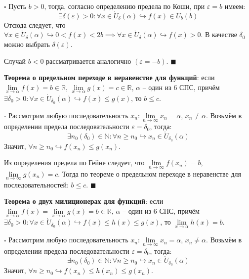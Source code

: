 \documentclass[12pt, a4paper, reqno]{article}
\begin{document}
    $\square$ Пусть $b > 0$, тогда, согласно определению предела по Коши, при $\varepsilon = b$
    имеем:
    \begin{equation*}
        \exists\delta(\varepsilon) > 0: \forall x\in \mathring U_{\delta}(\alpha) \hookrightarrow
        f(x)\in U_{b}(b)
    \end{equation*}
    Отсюда следует, что $\forall x\in \mathring U_{\delta}(\alpha) \hookrightarrow 0 < f(x) < 2b
    \implies \forall x\in \mathring U_{\delta}(\alpha) \hookrightarrow f(x) > 0$. В качестве
    $\delta_0$ можно выбрать $\delta(\varepsilon)$.

    Случай $b < 0$ рассматривается аналогично $(\varepsilon = -b)$. $\blacksquare$

    \textbf{Теорема о предельном переходе в неравенстве для функций}: если $\lim\limits_{x\to\alpha}
    f(x) = b\in\mathbb{R}$, $\lim\limits_{x\to\alpha} g(x) = c\in\mathbb{R}$, $\alpha$ -- один из 6
    СПС, причём $\exists\delta_0 > 0: \forall x\in \mathring U_{\delta_0}(\alpha) \hookrightarrow
    f(x)\leq g(x)$, то $b \leq c$.

    $\square$ Рассмотрим любую последовательность $x_n: \lim\limits_{n\to\infty} x_n = \alpha$, $x_n
    \neq \alpha$. Возьмём в определении предела последовательности $\varepsilon = \delta_0$, тогда:
    \begin{equation*}
        \exists n_0(\delta_0)\in\mathbb{N}: \forall n\geq n_0\hookrightarrow x_n\in \mathring
        U_{\delta_0}(\alpha)
    \end{equation*}
    Значит, $\forall n\geq n_0\hookrightarrow f(x_n) \leq g(x_n)$.

    Из определения предела по Гейне следует, что $\lim\limits_{n\to\infty} f(x_n) = b$,
    $\lim\limits_{n\to\infty} g(x_n) = c$. Тогда по теореме о предельном переходе в неравенстве для
    последовательностей: $b \leq c$. $\blacksquare$

    \textbf{Теорема о двух милиционерах для функций}: если $\lim\limits_{x\to\alpha} f(x) =
    \lim\limits_{x\to\alpha} g(x) = b\in\mathbb{R}$, $\alpha$ -- один из 6 СПС, причём
    $\exists\delta_0 > 0: \forall x\in\mathring U_{\delta_0}(\alpha) \hookrightarrow f(x) \leq h(x)
    \leq g(x)$, то $\lim\limits_{x\to\alpha} h(x) = b$.

    $\square$ Рассмотрим любую последовательность $x_n: \lim\limits_{n\to\infty} x_n = \alpha$,
    $x_n\neq \alpha$. Возьмём в определении предела последовательности $\varepsilon = \delta_0$,
    тогда:
    \begin{equation*}
        \exists n_0(\delta_0)\in\mathbb{N}: \forall n\geq n_0\hookrightarrow x_n\in \mathring
        U_{\delta_0}(\alpha)
    \end{equation*}
    Значит, $\forall n\geq n_0 \hookrightarrow f(x_n) \leq h(x_n) \leq g(x_n)$.
\end{document}
